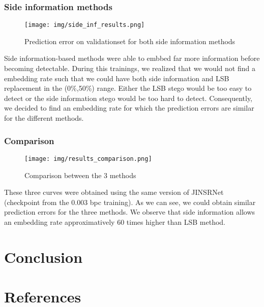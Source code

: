 \documentclass[12pt]{article}
\begin{document}
\subsubsection{Side information methods}
\begin{figure}[H]
    \texttt{[image: img/side\_inf\_results.png]}
    \caption[Side information methods results]{Prediction error on validationset for both side information methods}
    \label{fig:side_inf_results}
\end{figure}
Side information-based methods were able to embbed far more information before becoming detectable. During this trainings, we realized that we would not find a embedding rate such that we could have both side information and LSB replacement in the (0\%,50\%) range. Either the LSB stego would be too easy to detect or the side information stego would be too hard to detect. Consequently, we decided to find an embedding rate for which the prediction errors are similar for the different methods.

\subsubsection{Comparison}
\begin{figure}[H]
    \texttt{[image: img/results\_comparison.png]}
    \caption[Comparative results]{Comparison between the 3 methods}
    \label{fig:results_comparison}
\end{figure}
These three curves were obtained using the same version of JINSRNet (checkpoint from the 0.003 bpc training). As we can see, we could obtain similar prediction errors for the three methods. We observe that side information allows an embedding rate approximatively 60 times higher than LSB method.

\section{Conclusion}


\section*{References}
\end{document}
